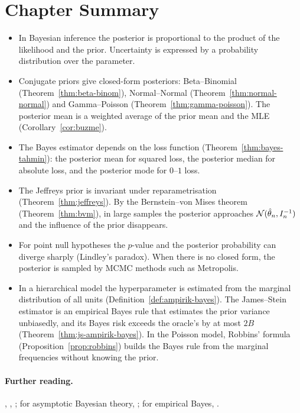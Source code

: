 \documentclass[main.tex]{subfiles}
\begin{document}
\section{Chapter Summary}
\begin{summary}
\begin{itemize}
  \item In Bayesian inference the posterior is proportional to the product of the likelihood and the prior. Uncertainty is expressed by a probability distribution over the parameter.
  \item Conjugate priors give closed-form posteriors: Beta--Binomial (Theorem~\ref{thm:beta-binom}), Normal--Normal (Theorem~\ref{thm:normal-normal}) and Gamma--Poisson (Theorem~\ref{thm:gamma-poisson}). The posterior mean is a weighted average of the prior mean and the MLE (Corollary~\ref{cor:buzme}).
  \item The Bayes estimator depends on the loss function (Theorem~\ref{thm:bayes-tahmin}): the posterior mean for squared loss, the posterior median for absolute loss, and the posterior mode for $0$--$1$ loss.
  \item The Jeffreys prior is invariant under reparametrisation (Theorem~\ref{thm:jeffreys}). By the Bernstein--von Mises theorem (Theorem~\ref{thm:bvm}), in large samples the posterior approaches $\mathcal{N}(\hat\theta_n,I_n^{-1})$ and the influence of the prior disappears.
  \item For point null hypotheses the $p$-value and the posterior probability can diverge sharply (Lindley's paradox). When there is no closed form, the posterior is sampled by MCMC methods such as Metropolis.
  \item In a hierarchical model the hyperparameter is estimated from the marginal distribution of all units (Definition~\ref{def:ampirik-bayes}). The James--Stein estimator is an empirical Bayes rule that estimates the prior variance unbiasedly, and its Bayes risk exceeds the oracle's by at most $2B$ (Theorem~\ref{thm:js-ampirik-bayes}). In the Poisson model, Robbins' formula (Proposition~\ref{prop:robbins}) builds the Bayes rule from the marginal frequencies without knowing the prior.
\end{itemize}
\end{summary}

\paragraph{Further reading.} \cite{gelman}, \cite[Chapter~11]{wasserman}, \cite[Chapter~4]{lehmann-casella}; for asymptotic Bayesian theory, \cite[Chapter~10]{vdv}; for empirical Bayes, \cite{robbins56,efron-morris73}.
\end{document}
